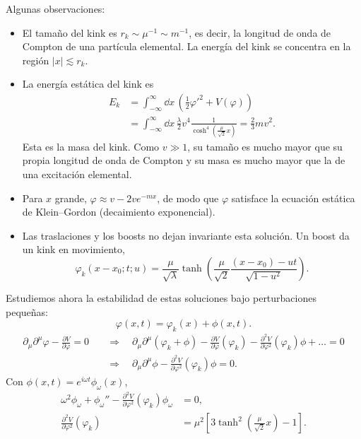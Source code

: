 \documentclass[11pt,a4paper]{article}
\begin{document}
Algunas observaciones:
\begin{itemize}
\item El tamaño del kink es $r_k\sim\mu^{-1}\sim m^{-1}$, es decir, la
  longitud de onda de Compton de una partícula elemental. La energía del
  kink se concentra en la región $|x|\lesssim r_k$.
\item La energía estática del kink es
  \begin{align*}
  E_k&=\int_{-\infty}^{\infty}\dd x\,
      \left(\frac12\varphi'^2+V(\varphi)\right)\\
    &=\int_{-\infty}^{\infty}\dd x\,
      \frac{\lambda}{2}v^4\frac{1}{\cosh^4(\frac{\mu}{\sqrt{2}}x)}
    =\frac23mv^2.
  \end{align*}
  Esta es la masa del kink. Como $v\gg1$, su tamaño es mucho mayor que
  su propia longitud de onda de Compton y su masa es mucho mayor que la
  de una excitación elemental.
\item Para $x$ grande, $\varphi\approx v-2v e^{-mx}$, de modo que
  $\varphi$ satisface la ecuación estática de Klein--Gordon (decaimiento
  exponencial).
\item Las traslaciones y los boosts no dejan invariante esta solución.
  Un boost da un kink en movimiento,
  \[
  \varphi_k(x-x_0;t;u)
    =\frac{\mu}{\sqrt{\lambda}}
    \tanh\left(\frac{\mu}{\sqrt{2}}\frac{(x-x_0)-ut}{\sqrt{1-u^2}}\right).
  \]
\end{itemize}

Estudiemos ahora la estabilidad de estas soluciones bajo perturbaciones pequeñas:
\[
\varphi(x,t)=\varphi_k(x)+\phi(x,t).
\]
\begin{align*}
\partial_\mu\partial^\mu\varphi-\frac{\partial V}{\partial\varphi}=0
&\quad\Rightarrow\quad
\partial_\mu\partial^\mu(\varphi_k+\phi)
-\frac{\partial V}{\partial\varphi}(\varphi_k)
-\frac{\partial^2V}{\partial\varphi^2}(\varphi_k)\phi+\dots=0\\
&\quad\Rightarrow\quad
\partial_\mu\partial^\mu\phi
-\frac{\partial^2V}{\partial\varphi^2}(\varphi_k)\phi=0.
\end{align*}
Con $\phi(x,t)=e^{i\omega t}\phi_\omega(x)$,
\begin{align*}
\omega^2\phi_\omega+\phi_\omega''
  -\frac{\partial^2V}{\partial\varphi^2}(\varphi_k)\phi_\omega&=0,\\
\frac{\partial^2V}{\partial\varphi^2}(\varphi_k)
  &=\mu^2\left[3\tanh^2\left(\frac{\mu}{\sqrt{2}}x\right)-1\right].
\end{align*}
\end{document}
